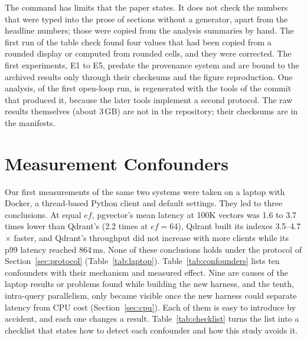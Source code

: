 \documentclass[preprint,12pt]{elsarticle}
\begin{document}
The command has limits that the paper states. It does not check the numbers that were typed into the prose of sections without a generator, apart from the headline numbers; those were copied from the analysis summaries by hand. The first run of the table check found four values that had been copied from a rounded display or computed from rounded cells, and they were corrected. The first experiments, E1 to E5, predate the provenance system and are bound to the archived results only through their checksums and the figure reproduction. One analysis, of the first open-loop
run, is regenerated with the tools of the commit that produced it, because the later tools implement a second protocol. The raw results themselves (about 3\,GB) are not in the repository; their checksums are in the manifests.

\section{Measurement Confounders}
\label{sec:confounders}

Our first measurements of the same two systems were taken on a laptop with Docker, a
thread-based Python client and default settings. They led to three conclusions. At equal
$ef$, pgvector's mean latency at 100K vectors was 1.6 to 3.7 times lower than Qdrant's
(2.2 times at $ef=64$), Qdrant built its indexes 3.5--4.7$\times$ faster, and Qdrant's
throughput did not increase with more clients while its p99 latency reached 864\,ms. None
of these conclusions holds under the protocol of Section~\ref{sec:protocol}
(Table~\ref{tab:laptop}). Table~\ref{tab:confounders} lists ten confounders with their
mechanism and measured effect. Nine are causes of the laptop results or problems found
while building the new harness, and the tenth, intra-query parallelism, only became
visible once the new harness could separate latency from CPU cost
(Section~\ref{sec:cpu}). Each of them is easy to introduce by accident, and each one
changes a result. Table~\ref{tab:checklist} turns the list into a checklist that states
how to detect each confounder and how this study avoids it.
\end{document}
